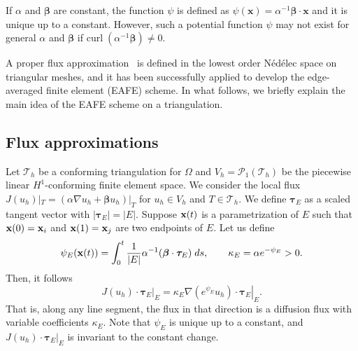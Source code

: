 \documentclass[a4paper]{article}
\theoremstyle{plain}
\theoremstyle{definition}
\numberwithin{equation}{section}
\newcommand{\bx}{{\bf x}}
\newcommand{\Th}{\mathcal{T}_h}
\begin{document}
If $\alpha$ and $\bm{\beta}$ are constant, the function $\psi$ is defined as  $\psi (\mathbf{x})=\alpha^{-1}\bm{\beta}\cdot\mathbf{x}$ and it is unique up to a constant.
However, such a potential function $\psi$ may not exist for general $\alpha$ and $\bm{\beta}$ if $\text{curl}\;(\alpha^{-1}\bm{\beta})\not=0$.

A proper flux approximation~\cite{XU99, LAZ05} is defined in the lowest order N\'ed\'elec space on triangular meshes, and it has been successfully applied to develop the edge-averaged finite element (EAFE) scheme.
In what follows, we briefly explain the main idea of the EAFE scheme on a triangulation.


\subsection{Flux approximations}
Let $\mathcal{T}_h$ be a conforming triangulation for $\Omega$ and $V_h=\mathcal{P}_1(\mathcal{T}_h)$ be the piecewise linear $H^1$-conforming finite element space. 
We consider the local flux $J(u_h)|_T=(\alpha \nabla u_h+\bm{\beta}u_h)|_T$ for $u_h\in V_h$ and $T\in\Th$. We define $\bm{\tau}_E$ as a scaled tangent vector with $|\bm{\tau}_E|=|E|$.
Suppose $\bx(t)$ is a parametrization of $E$ such that $\bx(0)=\bx_i$ and $\bx(1)=\bx_j$ are two endpoints of $E$. Let us define
\begin{equation}\label{eq:edgepotential}
\psi_E(\bx(t)) = \int_0^t \frac{1}{|E|}\alpha^{-1}(\bm{\beta}\cdot \bm{\tau}_E)\; {\rm d} s, \quad \quad\kappa_E=\alpha e^{-\psi_E}>0.
\end{equation}
Then, it follows
$$
\left.J(u_h)\cdot\bm{\tau}_E\right|_E=\left.\kappa_E\nabla(e^{\psi_E}u_h)\cdot\bm{\tau}_E\right|_E.
$$ 
That is, along any line segment, the flux in that direction is a diffusion flux with variable coefficients $\kappa_E$.
Note that $\psi_E$ is unique up to a constant, and $\left.J(u_h)\cdot\bm{\tau}_E\right|_E$ is invariant to the constant change.
\end{document}
